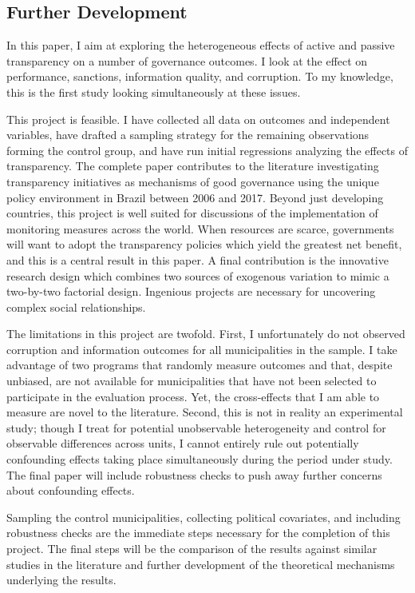 \documentclass[11pt]{article}
\begin{document}
\subsection{Further Development} \label{subsec:conclusion_paper3}

In this paper, I aim at exploring the heterogeneous effects of active and passive transparency on a number of governance outcomes. I look at the effect on performance, sanctions, information quality, and corruption. To my knowledge, this is the first study looking simultaneously at these issues.

This project is feasible. I have collected all data on outcomes and independent variables, have drafted a sampling strategy for the remaining observations forming the control group, and have run initial regressions analyzing the effects of transparency. The complete paper contributes to the literature investigating transparency initiatives as mechanisms of good governance using the unique policy environment in Brazil between 2006 and 2017. Beyond just developing countries, this project is well suited for discussions of the implementation of monitoring measures across the world. When resources are scarce, governments will want to adopt the transparency policies which yield the greatest net benefit, and this is a central result in this paper. A final contribution is the innovative research design which combines two sources of exogenous variation to mimic a two-by-two factorial design. Ingenious projects are necessary for uncovering complex social relationships.

The limitations in this project are twofold. First, I unfortunately do not observed corruption and information outcomes for all municipalities in the sample. I take advantage of two programs that randomly measure outcomes and that, despite unbiased, are not available for municipalities that have not been selected to participate in the evaluation process. Yet, the cross-effects that I am able to measure are novel to the literature. Second, this is not in reality an experimental study; though I treat for potential unobservable heterogeneity and control for observable differences across units, I cannot entirely rule out potentially confounding effects taking place simultaneously during the period under study. The final paper will include robustness checks to push away further concerns about confounding effects.

Sampling the control municipalities, collecting political covariates, and including robustness checks are the immediate steps necessary for the completion of this project. The final steps will be the comparison of the results against similar studies in the literature and further development of the theoretical mechanisms underlying the results.

\clearpage

\setlength\bibsep{0pt}


\end{document}
